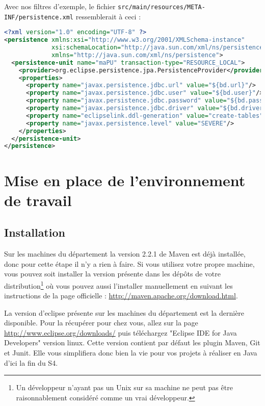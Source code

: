 \documentclass[a4paper,11pt]{article}
\begin{document}
Avec nos filtres d'exemple, le fichier \texttt{src/main/resources/META-INF/persistence.xml} ressemblerait à ceci :
\begin{lstlisting}[language=XML]
<?xml version="1.0" encoding="UTF-8" ?>
<persistence xmlns:xsi="http://www.w3.org/2001/XMLSchema-instance" 
             xsi:schemaLocation="http://java.sun.com/xml/ns/persistence/persistence_2_0.xsd" version="2.0" 
             xmlns="http://java.sun.com/xml/ns/persistence">
  <persistence-unit name="maPU" transaction-type="RESOURCE_LOCAL">
    <provider>org.eclipse.persistence.jpa.PersistenceProvider</provider>
    <properties>
      <property name="javax.persistence.jdbc.url" value="${bd.url}"/>
      <property name="javax.persistence.jdbc.user" value="${bd.user}"/>
      <property name="javax.persistence.jdbc.password" value="${bd.password}"/>
      <property name="javax.persistence.jdbc.driver" value="${bd.driver}"/>
      <property name="eclipselink.ddl-generation" value="create-tables"/>
      <property name="javax.persistence.level" value="SEVERE"/>
    </properties>
  </persistence-unit>
</persistence>
\end{lstlisting}

\section{Mise en place de l'environnement de travail}
\subsection{Installation}
Sur les machines du département la version 2.2.1 de Maven est déjà installée, donc pour cette étape il n'y a rien à faire.
Si vous utilisez votre propre machine, vous pouvez soit installer la version présente dans les dépôts de votre 
distribution\footnote{Un développeur n'ayant pas un Unix sur sa machine ne peut pas être raisonnablement considéré comme un vrai développeur.}
où vous pouvez aussi l'installer manuellement en suivant les instructions de la page officielle : \url{http://maven.apache.org/download.html}.

La version d'eclipse présente sur les machines du département est la dernière disponible. Pour la récupérer pour chez vous, 
allez sur la page \url{http://www.eclipse.org/downloads/} puis téléchargez "Eclipse IDE for Java Developers" version linux. 
Cette version contient par défaut les plugin Maven, Git et Junit. Elle vous simplifiera donc bien la vie pour vos projets 
à réaliser en Java d'ici la fin du S4.
\end{document}
